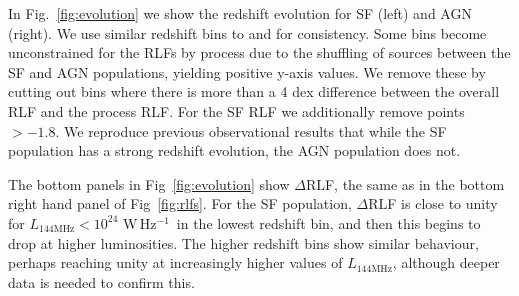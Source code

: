 \documentclass[usenatbib,fleqn,letters]{mnras}
\newcommand{\wphz}{$\,$W$\,$Hz$^{-1}$}
\newcommand{\llof}{$L_{\textrm{144MHz}}$}
\begin{document}
In Fig.~\ref{fig:evolution} we show the redshift evolution for SF (left) and AGN (right).  We use similar redshift bins to \cite{kondapally_cosmic_2022} and \cite{cochrane_lofar_2023} for consistency. Some bins become unconstrained for the RLFs by process due to the shuffling of sources between the SF and AGN populations, yielding positive y-axis values. We remove these by cutting out bins where there is more than a 4 dex difference between the overall RLF and the process RLF. For the SF RLF we additionally remove points $>-1.8$. We reproduce previous observational results that while the SF population has a strong redshift evolution, the AGN population does not. 

The bottom panels in Fig~\ref{fig:evolution} show $\Delta$RLF, the same as in the bottom right hand panel of Fig~\ref{fig:rlfs}. For the SF population, $\Delta$RLF is close to unity for $L_{\textrm{144MHz}} < 10^{24}\,$\wphz\ in the lowest redshift bin, and then this begins to drop at higher luminosities. The higher redshift bins show similar behaviour, perhaps reaching unity at increasingly higher values of $L_{\textrm{144MHz}}$, although deeper data is needed to confirm this. %
\end{document}
